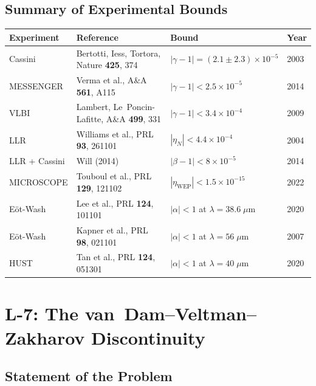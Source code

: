 \documentclass[11pt,a4paper]{article}
\theoremstyle{plain}
\theoremstyle{definition}
\theoremstyle{remark}
\begin{document}
\subsection{Summary of Experimental Bounds}

\begin{center}
\renewcommand{\arraystretch}{1.2}
\begin{longtable}{p{3cm}p{4cm}p{3.5cm}p{1.2cm}}
\toprule
\textbf{Experiment} & \textbf{Reference} & \textbf{Bound} &
\textbf{Year} \\
\midrule
\endhead
Cassini &
  Bertotti, Iess, Tortora,
  Nature \textbf{425}, 374 &
  $|\gamma-1| = (2.1\pm 2.3)\times 10^{-5}$ &
  2003 \\
MESSENGER &
  Verma et al.,
  A\&A \textbf{561}, A115 &
  $|\gamma-1| < 2.5\times 10^{-5}$ &
  2014 \\
VLBI &
  Lambert, Le~Poncin-Lafitte,
  A\&A \textbf{499}, 331 &
  $|\gamma-1| < 3.4\times 10^{-4}$ &
  2009 \\
LLR &
  Williams et al.,
  PRL \textbf{93}, 261101 &
  $|\eta_N| < 4.4\times 10^{-4}$ &
  2004 \\
LLR + Cassini &
  Will (2014) &
  $|\beta-1| < 8 \times 10^{-5}$ &
  2014 \\
MICROSCOPE &
  Touboul et al.,
  PRL \textbf{129}, 121102 &
  $|\eta_{\mathrm{WEP}}| < 1.5\times 10^{-15}$ &
  2022 \\
E\"ot-Wash &
  Lee et al.,
  PRL \textbf{124}, 101101 &
  $|\alpha|<1$ at $\lambda = 38.6\;\mu$m &
  2020 \\
E\"ot-Wash &
  Kapner et al.,
  PRL \textbf{98}, 021101 &
  $|\alpha|<1$ at $\lambda = 56\;\mu$m &
  2007 \\
HUST &
  Tan et al.,
  PRL \textbf{124}, 051301 &
  $|\alpha|<1$ at $\lambda = 40\;\mu$m &
  2020 \\
\bottomrule
\end{longtable}
\end{center}


\section{L-7: The van~Dam--Veltman--Zakharov Discontinuity}
\label{sec:vdvz}

\subsection{Statement of the Problem}
\end{document}
